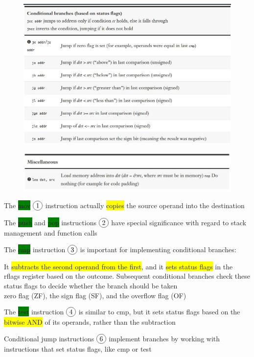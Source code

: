 \documentclass[]{project_plan}
\newcommand*\circled[1]{\tikz[baseline=(char.base)]{
            \node[shape=circle,draw,inner sep=2pt] (char) {#1};}}
\begin{document}
\begin{figure}[H]
  \centering
  \includegraphics[width=.8\linewidth]{common_instructions5.png}
\end{figure}
\begin{figure}[H]
  \centering
  \includegraphics[width=.8\linewidth]{common_instructions6.png}
\end{figure}

The \colorbox{green}{mov} $\circled{1}$ instruction actually \colorbox{yellow}{copies} the source operand into the destination

The \colorbox{green}{push} and \colorbox{green}{pop} instructions $\circled{2}$ have special significance with regard to stack
management and function calls

The \colorbox{green}{cmp} instruction $\circled{3}$ is important for implementing conditional branches:

It \colorbox{yellow}{subtracts the second operand from the first}, and it \colorbox{yellow}{sets status flags} in the rflags register based on the
outcome. Subsequent conditional branches check these status flags to decide whether the branch should be taken\\
zero flag (ZF), the sign flag (SF), and the overflow flag (OF)

The \colorbox{green}{test} instruction $\circled{4}$ is similar to cmp, but it sets status flags based on the \colorbox{yellow}{bitwise AND} of its
operands, rather than the subtraction

Conditional jump instructions $\circled{6}$ implement branches by working with instructions that set
status flags, like cmp or test
\end{document}
